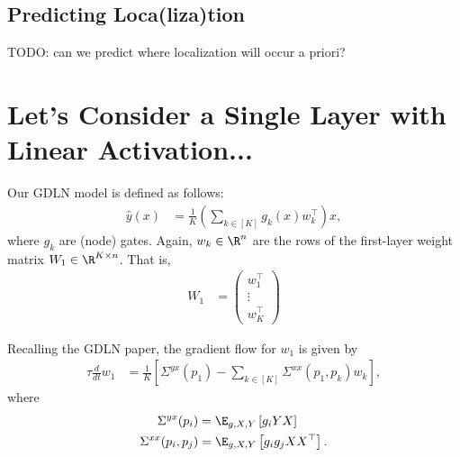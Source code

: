 \documentclass{article}
\begin{document}
\subsection{Predicting Loca(liza)tion}
TODO: can we predict where localization will occur a priori?



\section{Let's Consider a Single Layer with Linear Activation...}

Our GDLN model is defined as follows:
\begin{align}
  \hat{y}(x) &= \frac{1}{K} \left( \sum_{k \in [K]} g_k(x) w_k^\top \right) x, \label{eq:gdln_model}
\end{align}
where $g_k$ are (node) gates.
Again, $w_k \in \R^n$ are the rows of the first-layer weight matrix $W_1 \in \R^{K \times n}$.
That is,
\begin{align}
  W_1 &= \begin{pmatrix} w_1^\top \\ \vdots \\ w_K^\top \end{pmatrix}
\end{align}

Recalling the GDLN paper, the gradient flow for $w_1$ is given by
\begin{align}
  \tau \frac{d}{dt} w_1 &= \frac{1}{K} \left[ \Sigma^{yx}(p_1) - \sum_{k \in [K]} \Sigma^{xx}(p_1,p_k) w_k \right], \label{eq:grad_flow}
\end{align}
where
\begin{align}
  \Sigma^{yx}(p_i) &= \E_{g,X,Y} \left[ g_i Y X \right] \\
  \Sigma^{xx}(p_i,p_j) &= \E_{g,X,Y} \left[ g_i g_j X X^\top \right].
\end{align}
\end{document}
